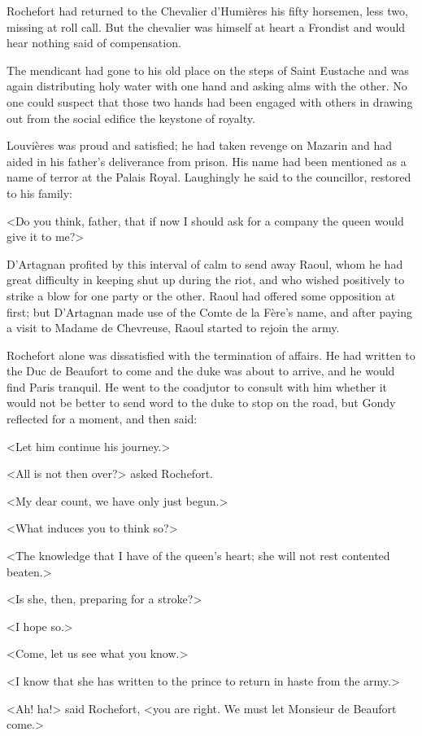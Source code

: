 Rochefort had returned to the Chevalier d'Humières his fifty horsemen, less two, missing at roll call. But the chevalier was himself at heart a Frondist and would hear nothing said of compensation.

The mendicant had gone to his old place on the steps of Saint Eustache and was again distributing holy water with one hand and asking alms with the other. No one could suspect that those two hands had been engaged with others in drawing out from the social edifice the keystone of royalty.

Louvières was proud and satisfied; he had taken revenge on Mazarin and had aided in his father's deliverance from prison. His name had been mentioned as a name of terror at the Palais Royal. Laughingly he said to the councillor, restored to his family:

<Do you think, father, that if now I should ask for a company the queen would give it to me?>

D'Artagnan profited by this interval of calm to send away Raoul, whom he had great difficulty in keeping shut up during the riot, and who wished positively to strike a blow for one party or the other. Raoul had offered some opposition at first; but D'Artagnan made use of the Comte de la Fère's name, and after paying a visit to Madame de Chevreuse, Raoul started to rejoin the army.

Rochefort alone was dissatisfied with the termination of affairs. He had written to the Duc de Beaufort to come and the duke was about to arrive, and he would find Paris tranquil. He went to the coadjutor to consult with him whether it would not be better to send word to the duke to stop on the road, but Gondy reflected for a moment, and then said:

<Let him continue his journey.>

<All is not then over?> asked Rochefort.

<My dear count, we have only just begun.>

<What induces you to think so?>

<The knowledge that I have of the queen's heart; she will not rest contented beaten.>

<Is she, then, preparing for a stroke?>

<I hope so.>

<Come, let us see what you know.>

<I know that she has written to the prince to return in haste from the army.>

<Ah! ha!> said Rochefort, <you are right. We must let Monsieur de Beaufort come.>

